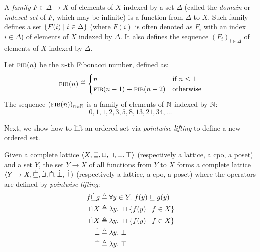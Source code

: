 A \emph{family} $F \in \Delta \to X$ of elements of $X$ indexed by a set $\Delta$ (called the \emph{domain} or \emph{indexed set} of $F$, which may be infinite) is a function from $\Delta$ to $X$. Such family defines a set $\{F(i) \mid i \in \Delta\}$ (where $F(i)$ is often denoted as $F_i$ with an index $i\in\Delta$) of elements of $X$ indexed by $\Delta$.
It also defines the sequence $(F_i)_{i\in\Delta}$ of elements of $X$ indexed by $\Delta$.

\begin{example}
  Let $\textsc{fib}(n)$ be the $n$-th Fibonacci number, defined as:
  \begin{align*}
    \textsc{fib}(n) \defeq \begin{cases}
      n & \text{if } n \le 1 \\
      \textsc{fib}(n-1) + \textsc{fib}(n-2) & \text{otherwise}
    \end{cases}
  \end{align*}
  The sequence $(\textsc{fib}(n))_{n\in\mathbb{N}}$ is a family of elements of $\mathbb{N}$ indexed by $\mathbb{N}$:
  \[ 0, 1, 1, 2, 3, 5, 8, 13, 21, 34, \ldots \]
\end{example}

Next, we show how to lift an ordered set via \emph{pointwise lifting} to define a new ordered set.

\begin{definition}
  Given a complete lattice $\langle X, \sqsubseteq, \sqcup, \sqcap, \bot, \top \rangle$ (respectively a lattice, a cpo, a poset) and a set $Y$, the set $Y \to X$ of all functions from $Y$ to $X$ forms a complete lattice $\langle Y \to X, \dot{\sqsubseteq}, \dot{\sqcup}, \dot{\sqcap}, \dot{\bot}, \dot{\top} \rangle$ (respectively a lattice, a cpo, a poset) where the operators are defined by \emph{pointwise lifting}:
\begin{align*}
  f \dot{\sqsubseteq} g & \triangleq \forall y \in Y.~ f(y) \sqsubseteq g(y) \\
  \dot{\sqcup} X & \triangleq \lambda y.~ \sqcup \{f(y) \mid f \in X\} \\
  \dot{\sqcap} X & \triangleq \lambda y.~ \sqcap \{f(y) \mid f \in X\} \\
  \dot{\bot} & \triangleq \lambda y.~ \bot \\
  \dot{\top} & \triangleq \lambda y.~ \top
\end{align*}
\end{definition}


